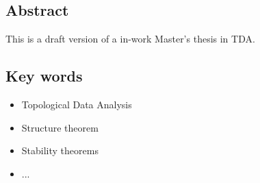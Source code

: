 \subsection*{Abstract}
This is a draft version of a in-work Master's thesis in TDA.


\subsection*{Key words}
\begin{itemize}
    \item Topological Data Analysis
    \item Structure theorem
    \item Stability theorems
    \item ...
\end{itemize}
